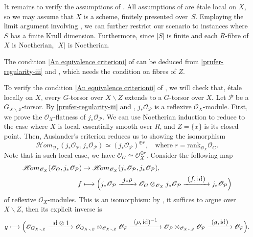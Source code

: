 \documentclass[JEP,XML,SOM,Unicode,published]{cedram}
\newcommand\mto{\mathchoice{\longmapsto}{\mapsto}{\mapsto}{\mapsto}}
\newcommand\To[1]{\mathchoice{\xrightarrow{\textstyle\kern4pt#1\kern3pt}}{\stackrel{#1}{\longrightarrow}}{}{}}
\let\backslash\smallsetminus
\newcommand{\cP}{\mathcal{P}}
\newcommand{\sO}{\mathscr{O}}
\newcommand{\sHom}{\mathscr{H}\! om}
\let\x\text
\let\q\quad
\theoremstyle{plain}
\theoremstyle{definition}
\begin{document}
It remains to verify the assumptions of . All assumptions of  are étale local on $X$, so we may assume that $X$ is a scheme, finitely presented over~$S$.
Employing the limit argument  involving , we can further restrict our scenario to instances where $S$ has a finite Krull dimension. Furthermore, since $|S|$ is finite and each $R$-fibre of $X$ is Noetherian, $|X|$ is Noetherian.

The condition \eqref{An equivalence criterioni} of  can be deduced from \eqref{prufer-regularity-iii} and , which needs the condition on fibres of $Z$.

To verify the condition \eqref{An equivalence criterionii} of , we will check that, étale locally on $X$, every $G$-torsor over $X\backslash Z$ extends to a $G$-torsor over $X$.
Let $\cP$ be a $G_{X\backslash Z}$-torsor.
By \eqref{prufer-regularity-iii} and , $j_{\ast}\sO_{\cP}$ is a reflexive $\sO_X$\nobreakdash-mod\-ule.
First, we prove the $\sO_X$-flatness of $j_{\ast}\sO_{\cP}$.
We can use Noetherian induction to reduce to the case where $X$ is local, essentially smooth over $R$, and $Z=\{x\}$ is its closed point.
Then, Auslander's criterion  reduces us to showing the isomorphism
\[
\sHom_{\sO_X}(j_{\ast}\sO_{\cP},j_{\ast}\sO_{\cP}) \simeq \left(j_{\ast}\sO_{\cP}\right)^{\oplus r}, \q \x{where } r=\mathrm{rank} _{\sO_X}\sO_G.
\]
Note that in such local case, we have $\sO_G\simeq \sO_{X}^{\oplus r}$. Consider the following map
\begin{align*}
\sHom_{\sO_X}(\sO_G,j_{\ast}\sO_{\cP}) & \to \sHom_{\sO_X}(j_{\ast}\sO_{\cP},j_{\ast}\sO_{\cP}), \\
f & \mto \Bigl( j_{\ast}\sO_{\cP} \To{j_{\ast}\rho} \sO_G\otimes_{\sO_X}j_{\ast}\sO_{\cP} \To{(f,\text{id})} j_{\ast}\sO_{\cP} \Bigr)
\end{align*}
of reflexive $\sO_X$\nobreakdash-mod\-ules. This is an isomorphism: by , it suffices to argue over $X\backslash Z$, then its explicit inverse is
\[
g \mto \Bigl( \sO_{G_{X\backslash Z}} \To{\text{id}\otimes 1}\sO_{G_{X\backslash Z}}\otimes_{\sO_{X\backslash Z}}\sO_{\cP} \To{(\rho, \text{id})^{-1}} \sO_{\cP}\otimes_{\sO_{X\backslash Z}}\sO_{\cP} \To{(g, \text{id})}\sO_{\cP} \Bigr).
\]
\end{document}
